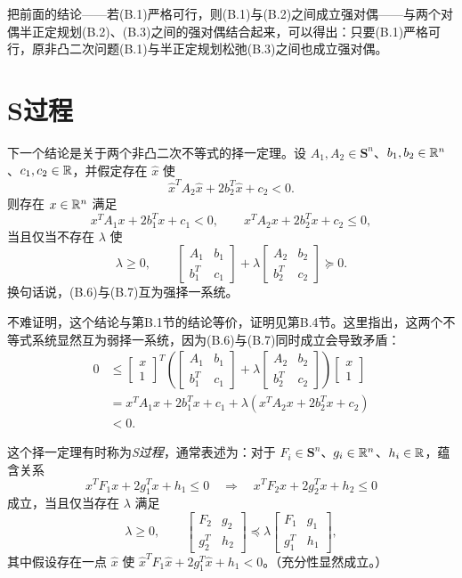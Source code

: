 把前面的结论——若(B.1)严格可行，则(B.1)与(B.2)之间成立强对偶——与两个对偶半正定规划(B.2)、(B.3)之间的强对偶结合起来，可以得出：只要(B.1)严格可行，原非凸二次问题(B.1)与半正定规划松弛(B.3)之间也成立强对偶。

\section{S过程}
下一个结论是关于两个非凸二次不等式的择一定理。设 $A_1,A_2\in\mathbf S^n$、$b_1,b_2\in\mathbb R^n$、$c_1,c_2\in\mathbb R$，并假定存在 $\hat x$ 使
\[
 \hat x^TA_2\hat x+2b_2^T\hat x+c_2<0.
\]
则存在 $x\in\mathbb R^n$ 满足
\begin{equation}
 x^TA_1x+2b_1^Tx+c_1<0,\qquad
 x^TA_2x+2b_2^Tx+c_2\leq0,\tag{B.6}
\end{equation}
当且仅当不存在 $\lambda$ 使
\begin{equation}
 \lambda\geq0,\qquad
 \begin{bmatrix}A_1&b_1\\b_1^T&c_1\end{bmatrix}
 +\lambda\begin{bmatrix}A_2&b_2\\b_2^T&c_2\end{bmatrix}\succeq0.\tag{B.7}
\end{equation}
换句话说，(B.6)与(B.7)互为强择一系统。

不难证明，这个结论与第B.1节的结论等价，证明见第B.4节。这里指出，这两个不等式系统显然互为弱择一系统，因为(B.6)与(B.7)同时成立会导致矛盾：
\begin{align*}
 0&\leq
 \begin{bmatrix}x\\1\end{bmatrix}^{\!T}
 \left(\begin{bmatrix}A_1&b_1\\b_1^T&c_1\end{bmatrix}
 +\lambda\begin{bmatrix}A_2&b_2\\b_2^T&c_2\end{bmatrix}\right)
 \begin{bmatrix}x\\1\end{bmatrix}\\
 &=x^TA_1x+2b_1^Tx+c_1+\lambda(x^TA_2x+2b_2^Tx+c_2)\\
 &<0.
\end{align*}

这个择一定理有时称为\emph{S过程}，通常表述为：对于 $F_i\in\mathbf S^n$、$g_i\in\mathbb R^n$、$h_i\in\mathbb R$，蕴含关系
\[
 x^TF_1x+2g_1^Tx+h_1\leq0
 \quad\Longrightarrow\quad
 x^TF_2x+2g_2^Tx+h_2\leq0
\]
成立，当且仅当存在 $\lambda$ 满足
\[
 \lambda\geq0,\qquad
 \begin{bmatrix}F_2&g_2\\g_2^T&h_2\end{bmatrix}
 \preceq\lambda\begin{bmatrix}F_1&g_1\\g_1^T&h_1\end{bmatrix},
\]
其中假设存在一点 $\hat x$ 使 $\hat x^TF_1\hat x+2g_1^T\hat x+h_1<0$。（充分性显然成立。）

